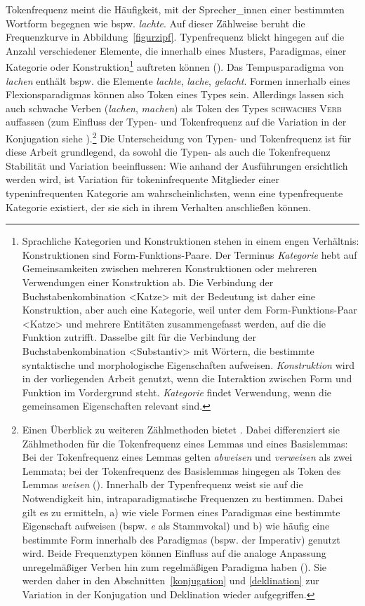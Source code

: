 Tokenfrequenz meint die Häufigkeit, mit der Sprecher\_innen einer bestimmten Wortform begegnen wie bspw. \textit{lachte}. Auf dieser Zählweise beruht die Frequenzkurve in Abbildung~\ref{figurzipf}. Typenfrequenz blickt hingegen auf die Anzahl verschiedener Elemente, die innerhalb eines Musters, Paradigmas, einer Kategorie oder Konstruktion\footnote{Sprachliche Kategorien und Konstruktionen stehen in einem engen Verhältnis: Konstruktionen sind Form-Funktions-Paare. Der Terminus \textit{Kategorie} hebt auf Gemeinsamkeiten zwischen mehreren Konstruktionen oder mehreren Verwendungen einer Konstruktion ab. Die Verbindung der Buchstabenkombination <Katze> mit der Bedeutung  ist daher eine Konstruktion, aber auch eine Kategorie, weil unter dem Form-Funktions-Paar <Katze> und   mehrere Entitäten zusammengefasst werden, auf die die Funktion zutrifft. Dasselbe gilt für die Verbindung der Buchstabenkombination <Substantiv> mit Wörtern, die bestimmte syntaktische und morphologische Eigenschaften aufweisen.  \textit{Konstruktion} wird in der vorliegenden Arbeit genutzt, wenn die Interaktion zwischen Form und Funktion im Vordergrund steht. \textit{Kategorie} findet Verwendung, wenn die gemeinsamen Eigenschaften relevant sind.} auftreten können (\cite[166]{Ellis.2002b}). Das Tempusparadigma von \textit{lachen} enthält bspw. die Elemente \textit{lachte}, \textit{lache}, \textit{gelacht}. Formen innerhalb eines Flexionsparadigmas können also Token eines Types sein. Allerdings lassen sich auch schwache Verben (\textit{lachen}, \textit{machen}) als Token des Types \textsc{schwaches Verb} auffassen (zum Einfluss der Typen- und Tokenfrequenz auf die Variation in der Konjugation siehe ).\footnote{Einen Überblick zu weiteren Zählmethoden bietet \textcite[15--21]{Krause.2016}. Dabei differenziert sie Zählmethoden für die Tokenfrequenz eines Lemmas und eines Basislemmas: Bei der Tokenfrequenz eines Lemmas gelten \textit{abweisen} und \textit{verweisen} als zwei Lemmata; bei der Tokenfrequenz des Basislemmas hingegen als Token des Lemmas \textit{weisen} (\cite[15--18]{Krause.2016}). Innerhalb der Typenfrequenz weist sie auf die Notwendigkeit hin, intraparadigmatische Frequenzen zu bestimmen. Dabei gilt es zu ermitteln, a) wie viele Formen eines Paradigmas eine bestimmte Eigenschaft aufweisen (bspw. \textit{e} als Stammvokal) und b) wie häufig eine bestimmte Form innerhalb des Paradigmas (bspw. der Imperativ) genutzt wird. Beide Frequenztypen können Einfluss auf die analoge Anpassung unregelmäßiger Verben hin zum regelmäßigen Paradigma haben (\cite[19--21]{Krause.2016}). Sie werden daher in den Abschnitten~\ref{konjugation} und \ref{deklination} zur Variation in der Konjugation und Deklination wieder aufgegriffen.}  Die Unterscheidung von Typen- und Tokenfrequenz ist für diese Arbeit grundlegend, da sowohl die Typen- als auch die Tokenfrequenz Stabilität und Variation beeinflussen: Wie anhand der Ausführungen ersichtlich werden wird, ist Variation für tokeninfrequente Mitglieder einer typeninfrequenten Kategorie am wahrscheinlichsten, wenn eine typenfrequente Kategorie existiert, der sie sich in ihrem Verhalten anschließen können.

